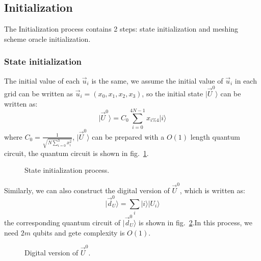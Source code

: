 \documentclass[%
 reprint,
 amsmath,amssymb,
pra,
]{revtex4-1}
\begin{document}
\begin{itemize}
\subsection{Initialization}

The Initialization process contains 2 steps: state initialization and meshing scheme oracle initialization.
\subsubsection{State initialization}
The initial value of  each $\vec{u}_i$ is the same, we assume the initial value of $\vec{u}_i$ in each grid can be written as $\vec{u}_i=(x_0,x_1,x_2,x_3)$, so the initial state  $|\vec{U}^0\rangle$ can be written as:
$$
|\vec{U}^0\rangle=C_0\sum_{i=0}^{4N-1}{x_{i\%4}|i\rangle}
$$
where $C_0=\frac{1}{\sqrt{N\sum_{i=0}^{3}{x_i^2}}}$, $|\vec{U}^0\rangle$ can be prepared with a $O(1)$ length quantum circuit, the quantum circuit is shown in fig.~\ref{state_initialization}.

\begin{figure}[htbp]
    \caption{State initialization process.  }
    \label{state_initialization}
\end{figure}
Similarly, we can also construct the digital version of $\vec{U}^0$, which is written as:
$$
|\vec{d}_U^0\rangle=\sum_i{|i\rangle|U_i\rangle}
$$
the corresponding quantum circuit of $|\vec{d}_U^0\rangle$ is shown in fig.~\ref{digit_state_initialization}.In this process, we need $2m$ qubits and gete complexity is $O(1)$.

\begin{figure}[htbp]
    \caption{Digital version of $\vec{U}^0$. }
    \label{digit_state_initialization}
\end{figure}


\end{itemize}
\end{document}
